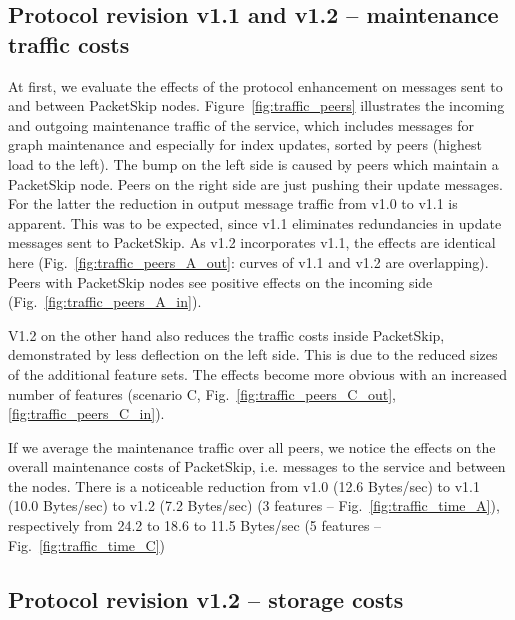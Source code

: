 \subsection{Protocol revision v1.1 and v1.2 -- maintenance traffic costs}
\label{subsec:11}

At first, we evaluate the effects of the protocol enhancement on messages sent to and between PacketSkip nodes.
Figure~\ref{fig:traffic_peers} illustrates the incoming and outgoing maintenance traffic of the service, which includes messages for graph maintenance and especially for index updates, sorted by peers (highest load to the left). The bump on the left side is caused by peers which maintain a PacketSkip node. Peers on the right side are just pushing their update messages. 
For the latter the reduction in output message traffic from v1.0 to v1.1 is apparent.
This was to be expected, since v1.1 eliminates redundancies in update messages sent to PacketSkip.
As v1.2 incorporates v1.1, the effects are identical here (Fig.~\ref{fig:traffic_peers_A_out}: curves of v1.1 and v1.2 are overlapping).
Peers with PacketSkip nodes see positive effects on the incoming side (Fig.~\ref{fig:traffic_peers_A_in}). 

V1.2 on the other hand also reduces the traffic costs inside PacketSkip, demonstrated by less deflection on the left side. This is due to the reduced sizes of the additional feature sets. The effects become more obvious with an increased number of features (scenario C, Fig.~\ref{fig:traffic_peers_C_out}, \ref{fig:traffic_peers_C_in}).

If we average the maintenance traffic over all peers, we notice the effects on the overall maintenance costs of PacketSkip, i.e. messages to the service and between the nodes. There is a noticeable reduction from v1.0 (12.6 Bytes/sec) to v1.1 (10.0 Bytes/sec) to v1.2 (7.2 Bytes/sec) (3 features -- Fig.~\ref{fig:traffic_time_A}), respectively from 24.2 to 18.6 to 11.5 Bytes/sec (5 features -- Fig.~\ref{fig:traffic_time_C})








\subsection{Protocol revision v1.2 -- storage costs}
\label{subsec:dht}

